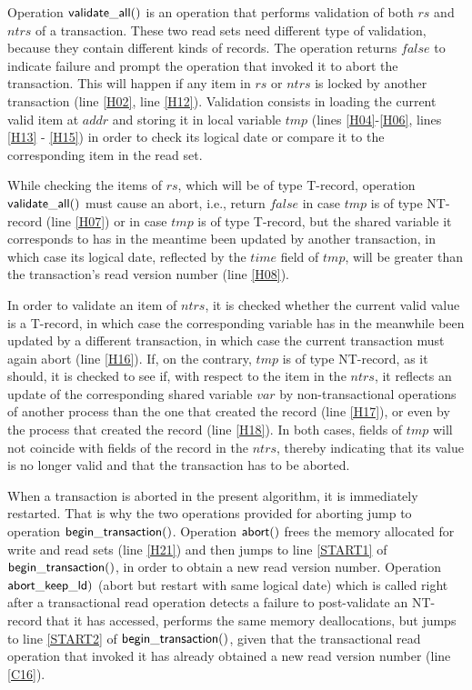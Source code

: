 \documentclass[11pt,letterpaper]{article}
\begin{document}
Operation ${\sf validate\_all()}$ is an operation that performs 
validation of both $\mathit{rs}$ and $\mathit{ntrs}$ of a transaction. 
These two read sets need different type of validation, because they 
contain different kinds of records. The 
operation returns $false$ to indicate failure and prompt the operation 
that invoked it to abort the transaction. This 
will happen if any item in $\mathit{rs}$ or $\mathit{ntrs}$ is 
locked by another transaction (line \ref{H02}, line \ref{H12}). Validation 
consists in loading the current valid item at $\mathit{addr}$ 
and storing it in local variable $\mathit{tmp}$ (lines \ref{H04}-\ref{H06}, 
lines \ref{H13} - \ref{H15}) in order to check its logical date or 
compare it to the corresponding item in the read set. 

While checking the items of $\mathit{rs}$, which will be of type 
T-record, operation ${\sf validate\_all()}$ must cause an abort, 
i.e., return $false$ in case $\mathit{tmp}$ is of type NT-record 
(line \ref{H07}) or in case $\mathit{tmp}$ is of type T-record, but the 
shared variable it corresponds to has in the meantime been updated 
by another transaction, in which case its 
logical date, reflected by the $\mathit{time}$ field of $\mathit{tmp}$, 
will be greater than the transaction{}'s read version number 
(line \ref{H08}). 

In order to validate an item of $\mathit{ntrs}$, it is checked whether 
the current valid value is a T-record, in which case 
the corresponding variable has in the meanwhile been updated by a 
different transaction, in which case the 
current transaction must again abort (line \ref{H16}). 
If, on the contrary, $\mathit{tmp}$ is of type NT-record, as it should, 
it is checked to see if, with respect to the item in the 
$\mathit{ntrs}$, it reflects an update of the corresponding shared 
variable $\mathit{var}$ by non-transactional operations of another 
process than the one that created the record 
(line \ref{H17}), or even by the process that created the record 
(line \ref{H18}). In both cases, fields of 
$\mathit{tmp}$ will not coincide with fields of the record in 
the $\mathit{ntrs}$, thereby indicating that its value is no longer valid 
and that the transaction has to be aborted.  

When a transaction is aborted in the present algorithm, 
it is immediately restarted. That is why the two operations 
provided for aborting jump to operation ${\sf begin\_transaction()}$.
 Operation ${\sf abort()}$ frees the memory 
allocated for write and read sets (line \ref{H21}) and then jumps to 
line \ref{START1} of ${\sf begin\_transaction()}$, 
in order to obtain a new read version number. 
Operation ${\sf abort\_keep\_ld)}$ (abort but restart with same logical date)
which is called right after 
a transactional read operation detects a failure to post-validate 
an NT-record that it has accessed, performs 
the same memory deallocations, but jumps to line \ref{START2} of  
${\sf begin\_transaction()}$, given that the 
transactional read operation that invoked it has already obtained 
a new read version number (line \ref{C16}).
\end{document}
